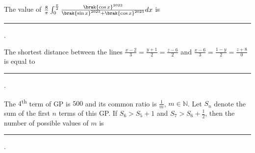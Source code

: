 \item The value of $\frac{8}{\pi}\int_{0}^{\frac{\pi}{2}}\frac{\brak{\cos x}^{2023}}{\brak{\sin x}^{2023}+\brak{\cos x}^{2023}}dx$ is \rule{1cm}{0.15mm}. 

\hfill{}

\item The shortest distance between the lines $\frac{x-2}{3}=\frac{y+1}{2}=\frac{z-6}{2}$ and $\frac{x-6}{3}=\frac{1-y}{2}=\frac{z+8}{0}$ is equal to \rule{1cm}{0.15mm}.

\hfill{}

\item The $4$\textsuperscript{th} term of GP is $500$ and its common ratio is $\frac{1}{m}$, $m\in \mathbb{N}$. Let $S_n$ denote the sum of the first $n$ terms of this GP. If $S_6>S_5+1$ and $S_7>S_6+\frac{1}{2}$, then the number of possible values of $m$ is \rule{1cm}{0.15mm}.

\hfill{}
